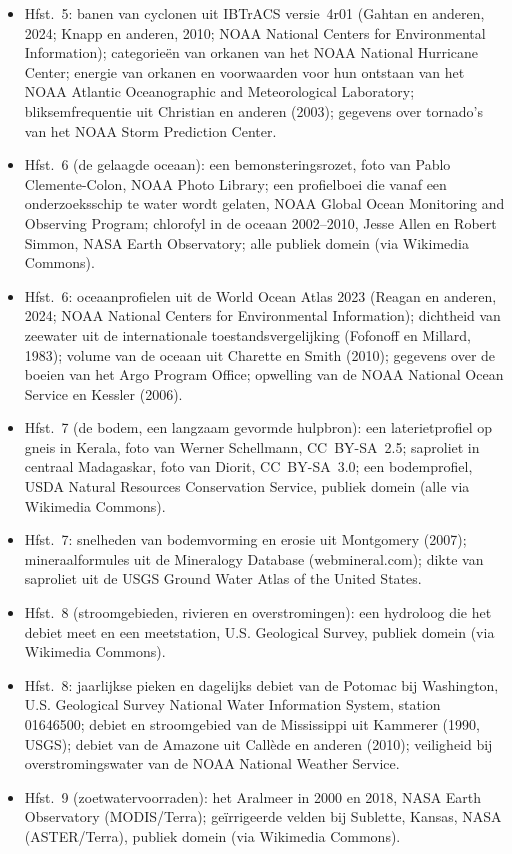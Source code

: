 \begin{itemize}
  \item Hfst.~5: banen van cyclonen uit IBTrACS versie~4r01 (Gahtan en anderen, 2024; Knapp en anderen, 2010; NOAA National Centers for Environmental Information); categorieën van orkanen van het NOAA National Hurricane Center; energie van orkanen en voorwaarden voor hun ontstaan van het NOAA Atlantic Oceanographic and Meteorological Laboratory; bliksemfrequentie uit Christian en anderen (2003); gegevens over tornado's van het NOAA Storm Prediction Center.
  \item Hfst.~6 (de gelaagde oceaan): een bemonsteringsrozet, foto van Pablo Clemente-Colon, NOAA Photo Library; een profielboei die vanaf een onderzoeksschip te water wordt gelaten, NOAA Global Ocean Monitoring and Observing Program; chlorofyl in de oceaan 2002--2010, Jesse Allen en Robert Simmon, NASA Earth Observatory; alle publiek domein (via Wikimedia Commons).
  \item Hfst.~6: oceaanprofielen uit de World Ocean Atlas 2023 (Reagan en anderen, 2024; NOAA National Centers for Environmental Information); dichtheid van zeewater uit de internationale toestandsvergelijking (Fofonoff en Millard, 1983); volume van de oceaan uit Charette en Smith (2010); gegevens over de boeien van het Argo Program Office; opwelling van de NOAA National Ocean Service en Kessler (2006).
  \item Hfst.~7 (de bodem, een langzaam gevormde hulpbron): een laterietprofiel op gneis in Kerala, foto van Werner Schellmann, CC~BY-SA~2.5; saproliet in centraal Madagaskar, foto van Diorit, CC~BY-SA~3.0; een bodemprofiel, USDA Natural Resources Conservation Service, publiek domein (alle via Wikimedia Commons).
  \item Hfst.~7: snelheden van bodemvorming en erosie uit Montgomery (2007); mineraalformules uit de Mineralogy Database (webmineral.com); dikte van saproliet uit de USGS Ground Water Atlas of the United States.
  \item Hfst.~8 (stroomgebieden, rivieren en overstromingen): een hydroloog die het debiet meet en een meetstation, U.S. Geological Survey, publiek domein (via Wikimedia Commons).
  \item Hfst.~8: jaarlijkse pieken en dagelijks debiet van de Potomac bij Washington, U.S. Geological Survey National Water Information System, station 01646500; debiet en stroomgebied van de Mississippi uit Kammerer (1990, USGS); debiet van de Amazone uit Callède en anderen (2010); veiligheid bij overstromingswater van de NOAA National Weather Service.
  \item Hfst.~9 (zoetwatervoorraden): het Aralmeer in 2000 en 2018, NASA Earth Observatory (MODIS/Terra); geïrrigeerde velden bij Sublette, Kansas, NASA (ASTER/Terra), publiek domein (via Wikimedia Commons).

\end{itemize}
